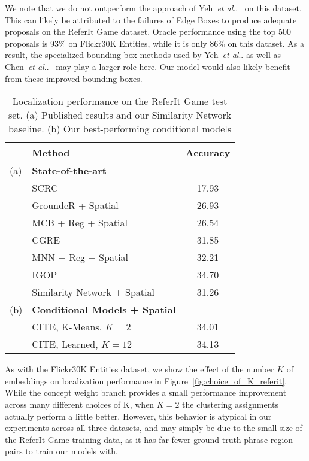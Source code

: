 \documentclass[runningheads]{llncs}
\makeatletter
\DeclareRobustCommand\onedot{\futurelet\@let@token\@onedot}
\def\@onedot{\ifx\@let@token.\else.\null\fi\xspace}
\def\etal{\emph{et al}\onedot}
\makeatother
\begin{document}
We note that we do not outperform the approach of Yeh~\etal~\cite{yehNIPS2017} on this dataset.  This can likely be attributed to the failures of Edge Boxes to produce adequate proposals on the ReferIt Game dataset.  Oracle performance using the top 500 proposals is 93\% on Flickr30K Entities, while it is only 86\% on this dataset.  As a result, the specialized bounding box methods used by Yeh~\etal as well as Chen~\etal~\cite{ChenICMR2017} may play a larger role here.  Our model would also likely benefit from these improved bounding boxes.

\begin{table}[t]
\centering
  \caption{Localization performance on the ReferIt Game test set. (a) Published results and our Similarity Network baseline. (b) Our best-performing conditional models}
\label{tab:referit}
    \begin{tabular}{|ll|c|}
      \hline
      & Method & Accuracy\\
      \hline
      \hline
      (a) & {\bf State-of-the-art} & \\
      & SCRC~\cite{hu2015natural} & 17.93\\
      & GroundeR + Spatial~\cite{rohrbach2015} & 26.93\\
      & MCB + Reg + Spatial~\cite{ChenICMR2017} & 26.54\\
      & CGRE~\cite{Luo_2017_CVPR} & 31.85\\
      & MNN + Reg + Spatial~\cite{ChenICMR2017} & 32.21\\
      & IGOP~\cite{yehNIPS2017} & 34.70\\
      & Similarity Network + Spatial & 31.26\\
      \hline
      (b) & {\bf Conditional Models + Spatial} &\\
      & CITE, K-Means, $K=2$ & 34.01\\
      & CITE, Learned, $K=12$ & 34.13\\
      \hline
    \end{tabular}
\end{table}

As with the Flickr30K Entities dataset, we show the effect of the number $K$ of embeddings on localization performance in Figure~\ref{fig:choice_of_K_referit}.  While the concept weight branch provides a small performance improvement across many different choices of K, when $K=2$ the clustering assignments actually perform a little better.  However, this behavior is atypical in our experiments across all three datasets, and may simply be due to the small size of the ReferIt Game training data, as it has far fewer ground truth phrase-region pairs to train our models with.
\end{document}
